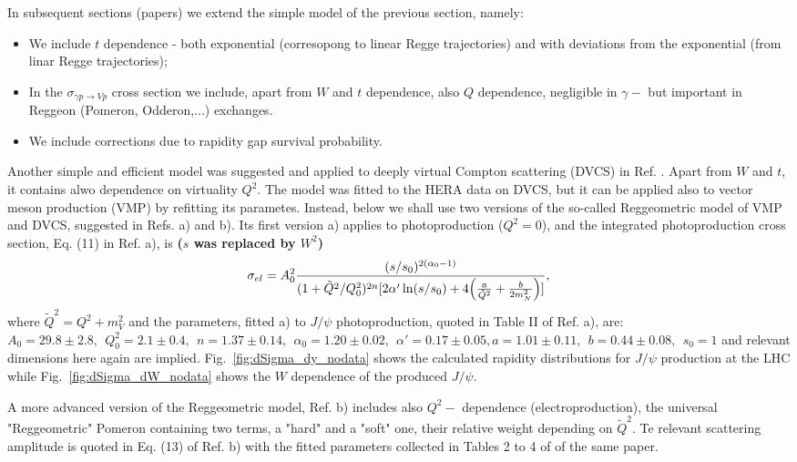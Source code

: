 \documentclass[12pt]{article}
\begin{document}
In subsequent sections (papers) we extend the simple model of the previous section, namely:
\begin{itemize}
\item We include $t$ dependence - both exponential (corresopong to linear Regge trajectories) and with deviations from the exponential (from linar Regge trajectories);
\item In the $\sigma_{\gamma p \rightarrow V p}$ cross section we include, apart from $W$ and $t$ dependence, also $Q$ dependence, negligible in $\gamma-$ but important in Reggeon (Pomeron, Odderon,...) exchanges.
\item We include corrections due to rapidity gap survival probability.
\end{itemize}

Another simple and efficient model was suggested and applied to deeply virtual Compton scattering (DVCS) in Ref. \cite{Capua}. Apart from $W$ and $t$, it contains alwo dependence on virtuality $Q^2$.
The model was fitted to the HERA data on DVCS, but it can be applied also to vector meson production (VMP) by refitting its parametes.
Instead, below we shall use two versions of the so-called Reggeometric model of VMP and DVCS, suggested in Refs. \cite{Fazio}a) and \cite{Fazio}b).
Its first version \cite{Fazio} a) applies to photoproduction ($Q^2=0$), and the integrated photoproduction cross section, Eq. (11) in Ref. \cite{Fazio}a), is {\bf($s$ was replaced by $W^2$)}
\begin{equation}
\sigma_{el}=A_0^2\frac{(s/s_0)^{2(\alpha_0-1)}}{(1+\tilde Q^2/Q^2_0)^{2n}[2\alpha'\ln(s/s_0)+4\Bigl(\frac{a}{\tilde Q^2}+\frac{b}{2m_N^2}\Bigr)]},
\end{equation}
where $\tilde Q^2=Q^2+m_V^2$ and the parameters, fitted \cite{Fazio}a) to $J/\psi$ photoproduction, quoted in
Table II of Ref. \cite{Fazio}a), are: $A_0=29.8\pm 2.8,\ \ Q_0^2=2.1\pm 0.4,\ \
n=1.37\pm 0.14,\ \ \alpha_0 =1.20\pm 0.02,\ \ \alpha'=0.17\pm 0.05, a=1.01\pm 0.11,\ \ b=0.44\pm 0.08,\ \ s_0=1$ and relevant dimensions here again are implied.
Fig.~\ref{fig:dSigma_dy_nodata} shows the calculated rapidity distributions for $J/\psi$ production at the LHC while Fig.~\ref{fig:dSigma_dW_nodata} shows the $W$ dependence of the produced $J/\psi$.

A more advanced version of the Reggeometric model, Ref. \cite{Fazio}b) includes also $Q^2-$ dependence (electroproduction), the universal "Reggeometric" Pomeron containing two terms, a "hard" and a "soft" one, their relative weight depending on $\tilde Q^2$. Te relevant scattering amplitude is quoted in Eq. (13) of Ref. \cite{Fazio}b) with the fitted parameters collected in Tables 2 to 4 of of the same paper.
\end{document}
